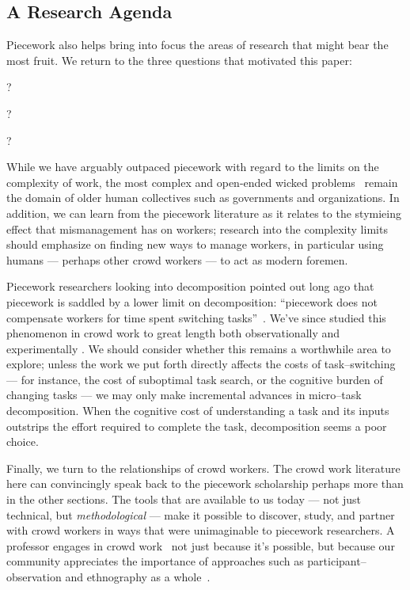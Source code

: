 \documentclass[trackingWork]{subfiles}
\begin{document}
\subsection{A Research Agenda}\label{sec:whatShouldBeTheFuture}
Piecework also helps bring into focus the
areas of research that might bear the most fruit.
We return to the three questions that motivated this paper:
\begin{inlinelist}
  \item {}?
  \item {}?
  \item {}?
\end{inlinelist}

While we have arguably outpaced piecework with regard to the limits on the complexity of work,
the most complex and open-ended wicked problems~\cite{rittel1973dilemmas} remain the domain of older human collectives such as governments and organizations. 
In addition, we can learn from the piecework literature as it relates to
the stymieing effect that mismanagement has on workers;
research into the complexity limits should emphasize on finding new ways to manage workers,
in particular using humans --- perhaps other crowd workers ---
to act as modern foremen.

Piecework researchers looking into decomposition pointed out long ago that
piecework is saddled by a lower limit on decomposition:
``piecework does not compensate workers for time spent switching tasks''~\cite{bewley1999wages}.
We've since studied this phenomenon in crowd work to great length both
observationally \cite{taskSearch} and
experimentally \cite{delayAndOrderLasecki}.
We should consider whether this remains a worthwhile area to explore; %
unless the work we put forth directly affects the costs of task--switching
--- for instance, the cost of suboptimal task search, or the cognitive burden of changing tasks ---
we may only make incremental advances in micro--task decomposition.
When the cognitive cost of understanding a task and its inputs outstrips the effort required to complete the task, decomposition seems a poor choice.

Finally, we turn to the relationships of crowd workers.
The crowd work literature here can convincingly speak back to
the piecework scholarship perhaps more than in the other sections.
The tools that are available to us today
--- not just technical, but \textit{methodological} ---
make it possible to
discover,
study, and
partner with 
crowd workers in ways that were unimaginable to piecework researchers.
A professor engages in crowd work~\cite{bighamHalfWorkday}
not just because it's possible, but because our community
appreciates the importance of approaches such as participant--observation and ethnography as a whole~\cite{olson2014ways}.


\onlyinsubfile{
  \balance{}
  \printbibliography
}
\end{document}
